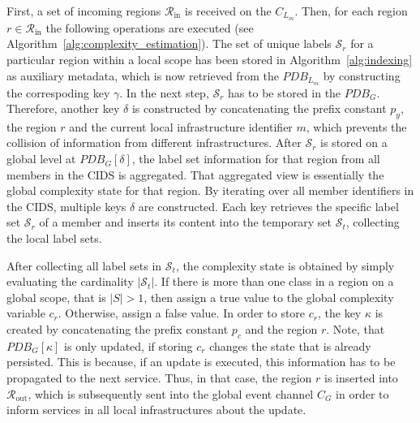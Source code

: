 \documentclass[../../main.tex]{subfiles}
\begin{document}
First, a set of incoming regions $\mathcal{R}_{\text{in}}$ is received on the $C_{L_m}$. Then, for each region $r \in \mathcal{R}_{\text{in}}$ the following operations are executed (see Algorithm~\ref{alg:complexity_estimation}). The set of unique labels $\mathcal{S}_r$ for a particular region within a local scope has been stored in Algorithm~\ref{alg:indexing} as auxiliary metadata, which is now retrieved from the $PDB_{L_m}$ by constructing the correspoding key $\gamma$. In the next step, $\mathcal{S}_r$ has to be stored in the $PDB_G$. Therefore, another key $\delta$ is constructed by concatenating the prefix constant $p_y$, the region $r$ and the current local infrastructure identifier $m$, which prevents the collision of information from different infrastructures. After $\mathcal{S}_r$ is stored on a global level at $PDB_G[\delta]$, the label set information for that region from all members in the CIDS is aggregated. That aggregated view is essentially the global complexity state for that region. By iterating over all member identifiers in the CIDS, multiple keys $\delta$ are constructed. Each key retrieves the specific label set $\mathcal{S}_r$ of a member and inserts its content into the temporary set $\mathcal{S}_t$, collecting the local label sets. 

After collecting all label sets in $\mathcal{S}_t$, the complexity state is obtained by simply evaluating the cardinality $|\mathcal{S}_t|$. If there is more than one class in a region on a global scope, that is $|S| > 1$, then assign a true value to the global complexity variable $c_r$. Otherwise, assign a false value. In order to store $c_r$, the key $\kappa$ is created by concatenating the prefix constant $p_c$ and the region $r$. Note, that $PDB_G[\kappa]$ is only updated, if storing $c_r$ changes the state that is already persisted. This is because, if an update is executed, this information has to be propagated to the next service. Thus, in that case, the region $r$ is inserted into $\mathcal{R}_{\text{out}}$, which is subsequently sent into the global event channel $C_G$ in order to inform services in all local infrastructures about the update.
\end{document}
